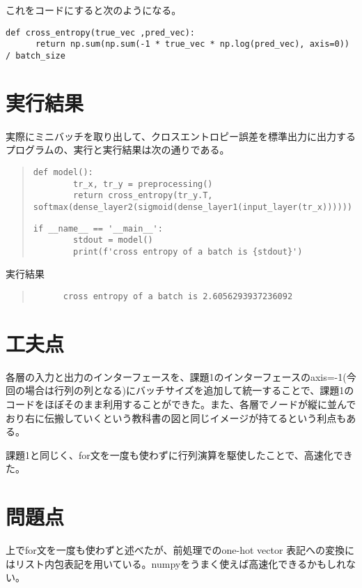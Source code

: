 \documentclass[platex,dvipdfmx]{jsarticle}
\begin{document}
  これをコードにすると次のようになる。

  \begin{lstlisting}[caption=ex2.py, label=crossentropy]
    def cross_entropy(true_vec ,pred_vec):
      return np.sum(np.sum(-1 * true_vec * np.log(pred_vec), axis=0)) / batch_size
  \end{lstlisting}

  \section{実行結果}

  実際にミニバッチを取り出して、クロスエントロピー誤差を標準出力に出力するプログラムの、実行と実行結果は次の通りである。

  \begin{quote}
    \begin{lstlisting}[caption=ex2.py, label=model]
      def model():
        tr_x, tr_y = preprocessing()
        return cross_entropy(tr_y.T, softmax(dense_layer2(sigmoid(dense_layer1(input_layer(tr_x))))))
    \end{lstlisting}

    \begin{lstlisting}[caption=ex2.py, label=main]
      if __name__ == '__main__': 
        stdout = model()
        print(f'cross entropy of a batch is {stdout}')
    \end{lstlisting}
  \end{quote}

  実行結果

  \begin{quote}
    \begin{verbatim}
      cross entropy of a batch is 2.6056293937236092
    \end{verbatim}
  \end{quote}

  \section{工夫点}

  各層の入力と出力のインターフェースを、課題1のインターフェースのaxis=-1(今回の場合は行列の列となる)にバッチサイズを追加して統一することで、課題1のコードをほぼそのまま利用することができた。また、各層でノードが縦に並んでおり右に伝搬していくという教科書の図と同じイメージが持てるという利点もある。

  課題1と同じく、for文を一度も使わずに行列演算を駆使したことで、高速化できた。

  \section{問題点}

  上でfor文を一度も使わずと述べたが、前処理でのone-hot vector 表記への変換にはリスト内包表記を用いている。numpyをうまく使えば高速化できるかもしれない。
\end{document}
